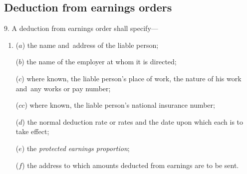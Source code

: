 \documentclass[12pt,a4paper]{article}
\begin{document}
\subsection[9. Deduction from earnings orders]{Deduction from earnings orders}

9.  A deduction from earnings order shall specify—
\begin{enumerate}\item[]
($a$) the name and~address of the liable person;

($b$) the name of the employer at whom it is directed;

($c$) where known, the liable person’s place of work, the nature of his work and~any works or pay number;

($cc$) where known, the liable person’s national insurance number;

%

($d$) the normal deduction rate or rates and the date upon which each is to take effect;

($e$) the 
\emph{protected earnings proportion};  %

($f$) the address to which amounts deducted from earnings are to be sent.
\end{enumerate}

\end{document}

